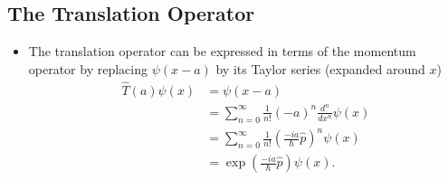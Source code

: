 \documentclass{article}
\begin{document}
\subsection{The Translation Operator}

\begin{itemize}
  \item The translation operator can be expressed in terms of the momentum operator by replacing $\psi(x - a)$ by its Taylor series (expanded around $x$) \begin{align*}
          \hat{T}(a) \psi(x) & = \psi(x - a)                                                                          \\
                             & = \sum_{n = 0}^\infty \frac{1}{n!} (-a)^n \frac{d^n}{d x^n} \psi(x)                    \\
                             & = \sum_{n = 0}^\infty \frac{1}{n!} \left( \frac{-i a}{\hbar} \hat{p} \right)^n \psi(x) \\
                             & = \exp \left( \frac{-i a}{\hbar} \hat{p} \right) \psi(x).
        \end{align*}
\end{itemize}
\end{document}
